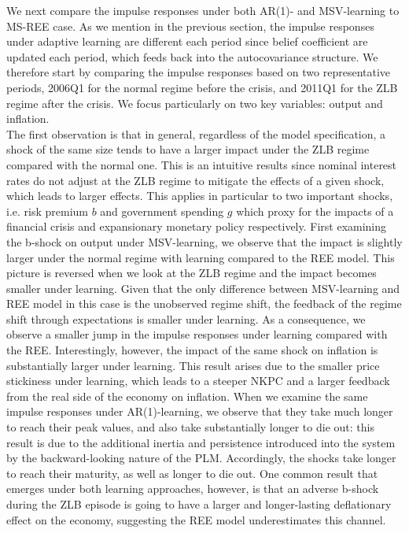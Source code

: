 \documentclass[12pt,reqno]{article}
\numberwithin{equation}{section}
\begin{document}
We next compare the impulse responses under both AR(1)- and MSV-learning to MS-REE case. As we mention in the previous section, the impulse responses under adaptive learning are different each period since belief coefficient are updated each period, which feeds back into the autocovariance structure. We therefore start by comparing the impulse responses based on two representative periods, 2006Q1 for the normal regime before the crisis, and 2011Q1 for the ZLB regime after the crisis. We focus particularly on two key variables: output and inflation. \\

\noindent
The first observation is that in general, regardless of the model specification, a shock of the same size tends to have a larger impact under the ZLB regime compared with the normal one. This is an intuitive results since nominal interest rates do not adjust at the ZLB regime to mitigate the effects of a given shock, which leads to larger effects. This applies in particular to two important shocks, i.e. risk premium $b$ and government spending $g$ which proxy for the impacts of a financial crisis and expansionary monetary policy respectively. First examining the b-shock on output under MSV-learning, we observe that the impact is slightly larger under the normal regime with learning compared to the REE model. This picture is reversed when we look at the ZLB regime and the impact becomes smaller under learning. Given that the only difference between MSV-learning and REE model in this case is the unobserved regime shift, the feedback of the regime shift through expectations is smaller under learning. As a consequence, we observe a smaller jump in the impulse responses under learning compared with the REE. Interestingly, however, the impact of the same shock on inflation is substantially larger under learning. This result arises due to the smaller price stickiness under learning, which leads to a steeper NKPC and a larger feedback from the real side of the economy on inflation. When we examine the same impulse responses under AR(1)-learning, we observe that they take much longer to reach their peak values, and also take substantially longer to die out: this result is due to the additional inertia and persistence introduced into the system by the backward-looking nature of the PLM. Accordingly, the shocks take longer to reach their maturity, as well as longer to die out. One common result that emerges under both learning approaches, however, is that an adverse b-shock during the ZLB episode  is going to have a larger and longer-lasting deflationary effect on the economy, suggesting the REE model underestimates this channel. \\
\end{document}
